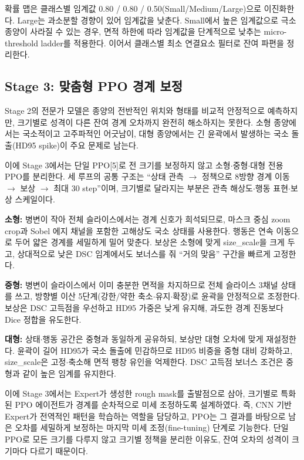\documentclass[11pt,a4paper]{article}
\begin{document}
확률 맵은 클래스별 임계값 0.80 / 0.80 / 0.50(Small/Medium/Large)으로 이진화한다. Large는 과소분할 경향이 있어 임계값을 낮춘다. Small에서 높은 임계값으로 극소 종양이 사라질 수 있는 경우, 면적 하한에 따라 임계값을 단계적으로 낮추는 micro-threshold ladder를 적용한다. 이어서 클래스별 최소 연결요소 필터로 잔여 파편을 정리한다.

\subsection{Stage 3: 맞춤형 PPO 경계 보정}
Stage 2의 전문가 모델은 종양의 전반적인 위치와 형태를 비교적 안정적으로 예측하지만, 크기별로 성격이 다른 잔여 경계 오차까지 완전히 해소하지는 못한다. 소형 종양에서는 국소적이고 고주파적인 어긋남이, 대형 종양에서는 긴 윤곽에서 발생하는 국소 돌출(HD95 spike)이 주요 문제로 남는다.

이에 Stage 3에서는 단일 PPO[5]로 전 크기를 보정하지 않고 소형$\cdot$중형$\cdot$대형 전용 PPO를 분리한다. 세 루프의 공통 구조는 ``상태 관측 $\rightarrow$ 정책으로 8방향 경계 이동 $\rightarrow$ 보상 $\rightarrow$ 최대 30 step''이며, 크기별로 달라지는 부분은 관측 해상도$\cdot$행동 표현$\cdot$보상 스케일이다.

\textbf{소형:} 병변이 작아 전체 슬라이스에서는 경계 신호가 희석되므로, 마스크 중심 zoom crop과 Sobel 에지 채널을 포함한 고해상도 국소 상태를 사용한다. 행동은 연속 이동으로 두어 얇은 경계를 세밀하게 밀어 맞춘다. 보상은 소형에 맞게 size\_scale을 크게 두고, 상대적으로 낮은 DSC 임계에서도 보너스를 줘 ``거의 맞음'' 구간을 빠르게 고정한다.

\textbf{중형:} 병변이 슬라이스에서 이미 충분한 면적을 차지하므로 전체 슬라이스 3채널 상태를 쓰고, 방향별 이산 5단계(강한/약한 축소$\cdot$유지$\cdot$확장)로 윤곽을 안정적으로 조정한다. 보상은 DSC 고득점을 우선하고 HD95 가중은 낮게 유지해, 과도한 경계 진동보다 Dice 정합을 유도한다.

\textbf{대형:} 상태$\cdot$행동 공간은 중형과 동일하게 공유하되, 보상만 대형 오차에 맞게 재설정한다. 윤곽이 길어 HD95가 국소 돌출에 민감하므로 HD95 비중을 중형 대비 강화하고, size\_scale은 고정$\cdot$축소해 면적 팽창 유인을 억제한다. DSC 고득점 보너스 조건은 중형과 같이 높은 임계를 유지한다.

이에 Stage 3에서는 Expert가 생성한 rough mask를 출발점으로 삼아, 크기별로 특화된 PPO 에이전트가 경계를 순차적으로 미세 조정하도록 설계하였다. 즉, CNN 기반 Expert가 전역적인 패턴을 학습하는 역할을 담당하고, PPO는 그 결과를 바탕으로 남은 오차를 세밀하게 보정하는 마지막 미세 조정(fine-tuning) 단계로 기능한다. 단일 PPO로 모든 크기를 다루지 않고 크기별 정책을 분리한 이유도, 잔여 오차의 성격이 크기마다 다르기 때문이다.
\end{document}
